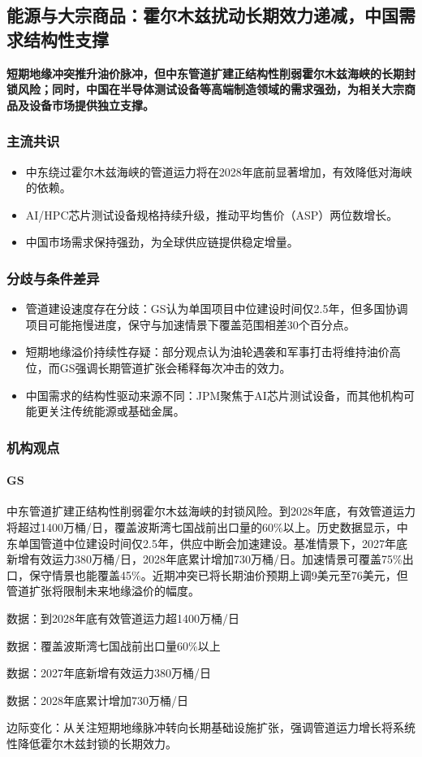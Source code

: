 \documentclass[11pt]{ctexart}
\begin{document}
\subsection{能源与大宗商品：霍尔木兹扰动长期效力递减，中国需求结构性支撑}
\textbf{短期地缘冲突推升油价脉冲，但中东管道扩建正结构性削弱霍尔木兹海峡的长期封锁风险；同时，中国在半导体测试设备等高端制造领域的需求强劲，为相关大宗商品及设备市场提供独立支撑。}
\subsubsection*{主流共识}
\begin{itemize}
  \item 中东绕过霍尔木兹海峡的管道运力将在2028年底前显著增加，有效降低对海峡的依赖。
  \item AI/HPC芯片测试设备规格持续升级，推动平均售价（ASP）两位数增长。
  \item 中国市场需求保持强劲，为全球供应链提供稳定增量。
\end{itemize}
\subsubsection*{分歧与条件差异}
\begin{itemize}
  \item 管道建设速度存在分歧：GS认为单国项目中位建设时间仅2.5年，但多国协调项目可能拖慢进度，保守与加速情景下覆盖范围相差30个百分点。
  \item 短期地缘溢价持续性存疑：部分观点认为油轮遇袭和军事打击将维持油价高位，而GS强调长期管道扩张会稀释每次冲击的效力。
  \item 中国需求的结构性驱动来源不同：JPM聚焦于AI芯片测试设备，而其他机构可能更关注传统能源或基础金属。
\end{itemize}
\subsubsection*{机构观点}
\paragraph{GS} 中东管道扩建正结构性削弱霍尔木兹海峡的封锁风险。到2028年底，有效管道运力将超过1400万桶/日，覆盖波斯湾七国战前出口量的60\%以上。历史数据显示，中东单国管道中位建设时间仅2.5年，供应中断会加速建设。基准情景下，2027年底新增有效运力380万桶/日，2028年底累计增加730万桶/日。加速情景可覆盖75\%出口，保守情景也能覆盖45\%。近期冲突已将长期油价预期上调9美元至76美元，但管道扩张将限制未来地缘溢价的幅度。
{\small\color{refgray}数据：到2028年底有效管道运力超1400万桶/日\par}
{\small\color{refgray}数据：覆盖波斯湾七国战前出口量60\%以上\par}
{\small\color{refgray}数据：2027年底新增有效运力380万桶/日\par}
{\small\color{refgray}数据：2028年底累计增加730万桶/日\par}
{\small\color{refgray}边际变化：从关注短期地缘脉冲转向长期基础设施扩张，强调管道运力增长将系统性降低霍尔木兹封锁的长期效力。\par}
\end{document}
